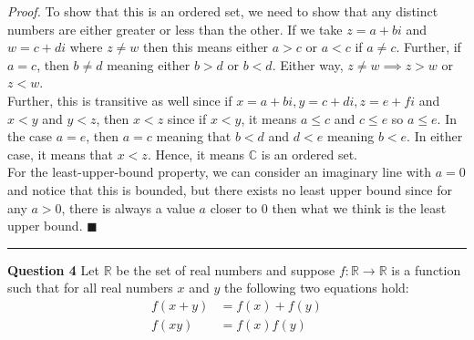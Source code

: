 \documentclass[14pt]{extarticle}
\begin{document}
\textit{Proof.} To show that this is an ordered set, we need to show that any distinct numbers are either greater or less than the other.
If we take $z = a + bi$ and $w = c + di$ where $z\neq w$ then this means either $a > c$ or $a < c$ if $a \neq c$. Further, if $a = c$, then
$b \neq d$ meaning either $b > d$ or $b < d$. Either way, $z\neq w \implies z > w$ or $z < w$.\\

Further, this is transitive as well since if $x = a + bi, y = c + di, z = e + fi$ and $x < y$ and $y < z$, then $x < z$ since
if $x < y$, it means $a \leq c$ and $c\leq e$ so $a \leq e$. In the case $a = e$, then $a = c$ meaning that $b < d$ and $d < e$ meaning
$b < e$. In either case, it means that $x < z$. Hence, it means $\mathbb{C}$ is an ordered set.\\

For the least-upper-bound property, we can consider an imaginary line with $a = 0$ and notice that this is bounded, but there exists
no least upper bound since for any $a > 0$, there is always a value $a$ closer to $0$ then what we think is the least upper bound.
\hfill
$\blacksquare$

\rule{\textwidth}{0.75pt}
\vspace{2mm}


\textbf{Question 4} Let $\mathbb{R}$ be the set of real numbers and suppose $f: \mathbb{R} \to \mathbb{R}$ is a function such that
for all real numbers $x$ and $y$ the following two equations hold:
\begin{align*}
    f(x + y) &= f(x) + f(y)\\[2mm]
    f(xy) &= f(x)f(y)
\end{align*}
\end{document}
